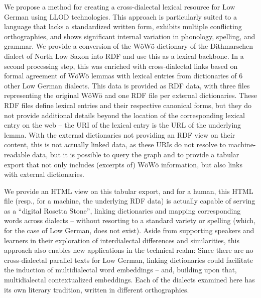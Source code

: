 \documentclass[11pt]{article}
\begin{document}
We propose a method for creating a cross-dialectal lexical resource for Low German using LLOD technologies. This approach is particularly suited to a language that lacks a standardized written form, exhibits multiple conflicting orthographies, and shows significant internal variation in phonology, spelling, and grammar. 
We provide a conversion of the WöWö dictionary of the Dithmarschen dialect of North Low Saxon into RDF and use this as a lexical backbone. In a second processing step, this was enriched with cross-dialectal links based on formal agreement of WöWö lemmas with lexical entries from dictionaries of 6 other Low German dialects.
This data is provided as RDF data, with three files representing the original WöWö and one RDF file per external dictionaries. These RDF files define lexical entries and their respective canonical forms, but they do not provide additional details beyond the location of the corresponding lexical entry on the web -- the URI of the lexical entry is the URL of the underlying lemma. With the external dictionaries not providing an RDF view on their content, this is not actually linked data, as these URIs do not resolve to machine-readable data, but it is possible to query the graph and to provide a tabular export that not only includes (excerpts of) WöWö information, but also links with external dictionaries.

We provide an HTML view on this tabular export, and for a human, this HTML file (resp., for a machine, the underlying RDF data) is actually capable of serving as a ``digital Rosetta Stone'', linking dictionaries and mapping corresponding words across dialects -- without resorting to a standard variety or spelling (which, for the case of Low German, does not exist). 
Aside from supporting speakers and learners in their exploration of interdialectal differences and similarities, this approach also enables new applications in the technical realm: Since there are no cross-dialectal parallel texts for Low German, linking dictionaries could facilitate the induction of multidialectal word embeddings -- and, building upon that, multidialectal contextualized embeddings. Each of the dialects examined here has its own literary tradition, written in different orthographies.
\end{document}
